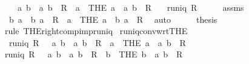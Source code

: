 \begin{isabellebody}
\ \ \ {\isachardoublequoteopen}{\isasymforall}\ a\ b\ {\isachardot}\ {\isacharparenleft}a{\isacharcomma}\ b{\isacharparenright}\ {\isasymin}\ R\ {\isasymlongrightarrow}\ a\ {\isacharequal}\ {\isacharparenleft}THE\ a\ {\isachardot}\ {\isacharparenleft}a{\isacharcomma}\ b{\isacharparenright}\ {\isasymin}\ R{\isacharparenright}{\isachardoublequoteclose}\isanewline
\ \ \ {\isachardoublequoteopen}runiq\ {\isacharparenleft}R{\isasyminverse}{\isacharparenright}{\isachardoublequoteclose}\isanewline
%
\isadelimproof
%
\endisadelimproof
%
\isatagproof
{}\isamarkupfalse%
\ {\isacharminus}\isanewline
\ \ \isamarkupfalse%
\ assms\ \isamarkupfalse%
\ {\isachardoublequoteopen}{\isasymforall}\ b\ a\ {\isachardot}\ {\isacharparenleft}b{\isacharcomma}\ a{\isacharparenright}\ {\isasymin}\ R{\isasyminverse}\ {\isasymlongrightarrow}\ a\ {\isacharequal}\ {\isacharparenleft}THE\ a\ {\isachardot}\ {\isacharparenleft}b{\isacharcomma}\ a{\isacharparenright}\ {\isasymin}\ R{\isasyminverse}{\isacharparenright}{\isachardoublequoteclose}\ \isamarkupfalse%
\ auto\isanewline
\ \ \isamarkupfalse%
\ \isamarkupfalse%
\ {\isacharquery}thesis\ \isamarkupfalse%
\ {\isacharparenleft}rule\ THE{\isacharunderscore}right{\isacharunderscore}comp{\isacharunderscore}imp{\isacharunderscore}runiq{\isacharparenright}\isanewline
{}\isamarkupfalse%
%
\endisatagproof
{\isafoldproof}%
%
\isadelimproof
\isanewline
%
\endisadelimproof
\isanewline
{}\isamarkupfalse%
\ runiq{\isacharunderscore}conv{\isacharunderscore}wrt{\isacharunderscore}THE{\isacharcolon}\isanewline
\ \ {\isachardoublequoteopen}runiq\ {\isacharparenleft}R{\isasyminverse}{\isacharparenright}\ {\isasymlongleftrightarrow}\ {\isacharparenleft}{\isasymforall}\ a\ b\ {\isachardot}\ {\isacharparenleft}a{\isacharcomma}\ b{\isacharparenright}\ {\isasymin}\ R\ {\isasymlongrightarrow}\ a\ {\isacharequal}\ {\isacharparenleft}THE\ a\ {\isachardot}\ {\isacharparenleft}a{\isacharcomma}\ b{\isacharparenright}\ {\isasymin}\ R{\isacharparenright}{\isacharparenright}{\isachardoublequoteclose}\isanewline
%
\isadelimproof
%
\endisadelimproof
%
\isatagproof
{}\isamarkupfalse%
\ {\isacharminus}\isanewline
\ \ \isamarkupfalse%
\ {\isachardoublequoteopen}runiq\ {\isacharparenleft}R{\isasyminverse}{\isacharparenright}\ {\isasymlongleftrightarrow}\ {\isacharparenleft}{\isasymforall}\ a\ b\ {\isachardot}\ {\isacharparenleft}a{\isacharcomma}\ b{\isacharparenright}\ {\isasymin}\ R{\isasyminverse}\ {\isasymlongrightarrow}\ b\ {\isacharequal}\ {\isacharparenleft}THE\ b\ {\isachardot}\ {\isacharparenleft}a{\isacharcomma}\ b{\isacharparenright}\ {\isasymin}\ R{\isasyminverse}{\isacharparenright}{\isacharparenright}{\isachardoublequoteclose}\ \isamarkupfalse%

\end{isabellebody}
